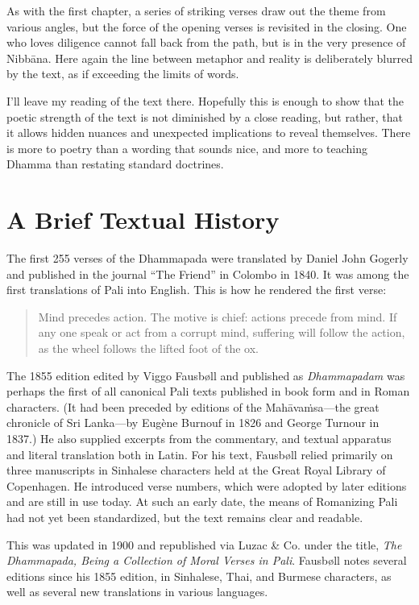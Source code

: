 \documentclass[12pt,openany]{book}%
\begin{document}
As with the first chapter, a series of striking verses draw out the theme from various angles, but the force of the opening verses is revisited in the closing. One who loves diligence cannot fall back from the path, but is in the very presence of \textsanskrit{Nibbāna}. Here again the line between metaphor and reality is deliberately blurred by the text, as if exceeding the limits of words.

I’ll leave my reading of the text there. Hopefully this is enough to show that the poetic strength of the text is not diminished by a close reading, but rather, that it allows hidden nuances and unexpected implications to reveal themselves. There is more to poetry than a wording that sounds nice, and more to teaching Dhamma than restating standard doctrines.

\section*{A Brief Textual History}

The first 255 verses of the Dhammapada were translated by Daniel John Gogerly and published in the journal “The Friend” in Colombo in 1840. It was among the first translations of Pali into English. This is how he rendered the first verse:

\begin{verse}%
Mind precedes action. The motive is chief: actions precede from mind. If any one speak or act from a corrupt mind, suffering will follow the action, as the wheel follows the lifted foot of the ox.

%
\end{verse}

The 1855 edition edited by Viggo Fausbøll and published as \textit{Dhammapadam} was perhaps the first of all canonical Pali texts published in book form and in Roman characters. (It had been preceded by editions of the \textsanskrit{Mahāvaṁsa}—the great chronicle of Sri Lanka—by Eugène Burnouf in 1826 and George Turnour in 1837.) He also supplied excerpts from the commentary, and textual apparatus and literal translation both in Latin. For his text, Fausbøll relied primarily on three manuscripts in Sinhalese characters held at the Great Royal Library of Copenhagen. He introduced verse numbers, which were adopted by later editions and are still in use today. At such an early date, the means of Romanizing Pali had not yet been standardized, but the text remains clear and readable.

This was updated in 1900 and republished via Luzac \& Co. under the title, \textit{The Dhammapada, Being a Collection of Moral Verses in Pali}. Fausbøll notes several editions since his 1855 edition, in Sinhalese, Thai, and Burmese characters, as well as several new translations in various languages.
\end{document}
